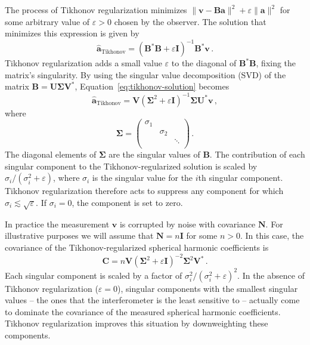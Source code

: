 \documentclass[twocolumn]{aastex61}
\renewcommand{\b}{\pmb}
\newcommand{\atikh}{\b{\hat a}_\text{Tikhonov}}
\begin{document}
The process of Tikhonov regularization minimizes $\|\b v - \b B\b a\|^2 + \varepsilon\|\b a\|^2$ for
some arbitrary value of $\varepsilon > 0$ chosen by the observer. The solution that minimizes this
expression is given by
\begin{equation}\label{eq:tikhonov-solution}
    \atikh = (\b B^*\b B + \varepsilon\b I)^{-1}\b B^*\b v\,.
\end{equation}
Tikhonov regularization adds a small value $\varepsilon$ to the diagonal of $\b B^*\b B$, fixing the
matrix's singularity. By using the singular value decomposition (SVD) of the matrix $\b B = \b U \b
\Sigma \b V^*$, Equation~\ref{eq:tikhonov-solution} becomes
\begin{equation}
    \atikh = \b V (\b\Sigma^2 + \varepsilon \b I)^{-1}\b\Sigma \b U^*\b v\,,
\end{equation}
where
\[
    \b\Sigma = \left(
        \begin{array}{ccc}
            \sigma_1 & & \\
                     & \sigma_2 & \\
                     & & \ddots \\
        \end{array}
    \right)\,.
\]
The diagonal elements of $\b\Sigma$ are the singular values of $\b B$. The contribution of each
singular component to the Tikhonov-regularized solution is scaled by $\sigma_i / (\sigma_i^2 +
\varepsilon)$, where $\sigma_i$ is the singular value for the $i$th singular component. Tikhonov
regularization therefore acts to suppress any component for which
$\sigma_i\lesssim\sqrt{\varepsilon}$.  If $\sigma_i = 0$, the component is set to zero.

In practice the measurement $\b v$ is corrupted by noise with covariance $\b N$. For illustrative
purposes we will assume that $\b N=n\b I$ for some $n>0$. In this case, the covariance of the
Tikhonov-regularized spherical harmonic coefficients is
\begin{equation}
    \b C = n \b V (\b\Sigma^2 + \varepsilon\b I)^{-2} \b\Sigma^2 \b V^*\,.
\end{equation}
Each singular component is scaled by a factor of $\sigma_i^2/(\sigma_i^2 + \varepsilon)^2$.  In the
absence of Tikhonov regularization ($\varepsilon=0$), singular components with the smallest singular
values -- the ones that the interferometer is the least sensitive to -- actually come to dominate
the covariance of the measured spherical harmonic coefficients. Tikhonov regularization improves
this situation by downweighting these components.
\end{document}
